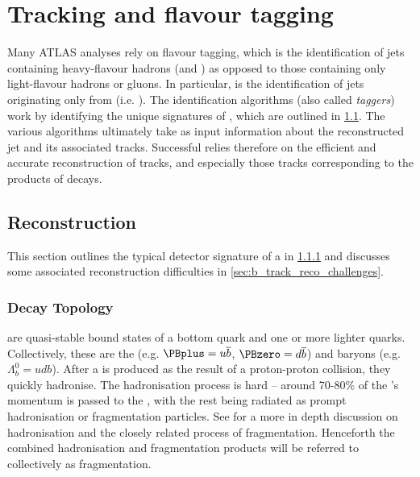 \chapter{Tracking and flavour tagging}\label{chap:tracking}

Many ATLAS analyses rely on flavour tagging, which is the identification of jets containing heavy-flavour hadrons (\bhadrons and \chadrons) as opposed to those containing only light-flavour hadrons or gluons.
In particular, \btagging is the identification of jets originating only from \bhadrons (i.e. \bjets).
The \bjet identification algorithms (also called \textit{taggers}) work by identifying the unique signatures of \bjets, which are outlined in \cref{sec:b_had_reco}.
The various \btagging algorithms ultimately take as input information about the reconstructed jet and its associated tracks.
Successful \btagging relies therefore on the efficient and accurate reconstruction of tracks, and especially those tracks corresponding to the products of \bhadron decays.






\section{\texorpdfstring{\bhadron}{b-hadron} Reconstruction}
\label{sec:b_had_reco}

This section outlines the typical detector signature of a \bhadron in \cref{sec:b_decay_topology} and discusses some associated reconstruction difficulties in \cref{sec:b_track_reco_challenges}.


\subsection{Decay Topology}
\label{sec:b_decay_topology}

\bhadrons are quasi-stable bound states of a bottom quark and one or more lighter quarks.
Collectively, these are the \bmesons (e.g. $\PBplus = u \overline{b}$, $\PBzero = d \overline{b}$) and baryons (e.g. $\Lambda_b^0 = udb$).
After a \bquark is produced as the result of a proton-proton collision, they quickly hadronise.
The hadronisation process is hard -- around 70-80\% of the \bquark's momentum is passed to the \bhadron, with the rest being radiated as prompt hadronisation or fragmentation particles.
See  for a more in depth discussion on hadronisation and the closely related process of fragmentation.
Henceforth the combined hadronisation and fragmentation products will be referred to collectively as fragmentation.

